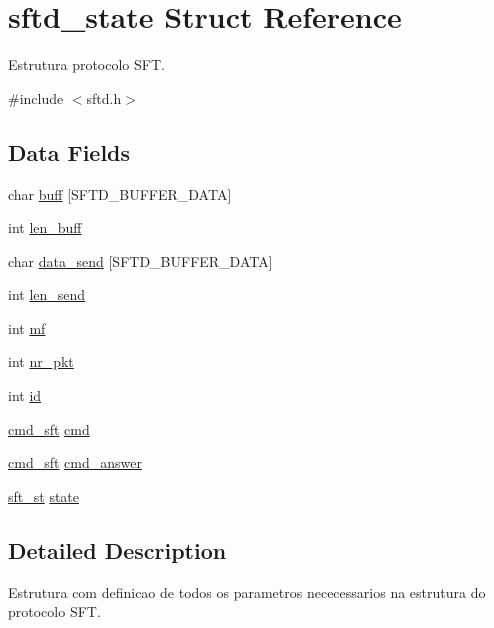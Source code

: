 \hypertarget{structsftd__state}{
\section{sftd\_\-state Struct Reference}
\label{structsftd__state}
}


Estrutura protocolo SFT.  




{\ttfamily \#include $<$sftd.h$>$}

\subsection*{Data Fields}
\begin{DoxyCompactItemize}
\item 
char \hyperlink{structsftd__state_a7592a31166152ec71e5c82df4bec0ff6}{buff} \mbox{[}SFTD\_\-BUFFER\_\-DATA\mbox{]}
\item 
int \hyperlink{structsftd__state_a880aa9d9dc3a838772d4ce434b5adf59}{len\_\-buff}
\item 
char \hyperlink{structsftd__state_aa96301eab5ae247fc2a8e6e6c526fec8}{data\_\-send} \mbox{[}SFTD\_\-BUFFER\_\-DATA\mbox{]}
\item 
int \hyperlink{structsftd__state_a358d042191980bf59769f7db60e0e116}{len\_\-send}
\item 
int \hyperlink{structsftd__state_a23fcaaae4f5f1874069db0d74550c6b7}{mf}
\item 
int \hyperlink{structsftd__state_a79a4ba0983912c7066e1f324ee126c58}{nr\_\-pkt}
\item 
int \hyperlink{structsftd__state_a605709a687f776374adee211a843181e}{id}
\item 
\hyperlink{sftd_8h_a698dfd82c5a5a0fa6dee46c157bc2e4f}{cmd\_\-sft} \hyperlink{structsftd__state_a0018f34317e438d32f3b5de5f1adc794}{cmd}
\item 
\hyperlink{sftd_8h_a698dfd82c5a5a0fa6dee46c157bc2e4f}{cmd\_\-sft} \hyperlink{structsftd__state_acee890ae951e741a8c81d459f151770f}{cmd\_\-answer}
\item 
\hyperlink{sftd_8h_a0d1bbcd6042d3b55934498867962022f}{sft\_\-st} \hyperlink{structsftd__state_aa9fadd1aca3bdd4ab6b2ffacf1bfc4a8}{state}
\end{DoxyCompactItemize}


\subsection{Detailed Description}
Estrutura com definicao de todos os parametros nececessarios na estrutura do protocolo SFT. 

